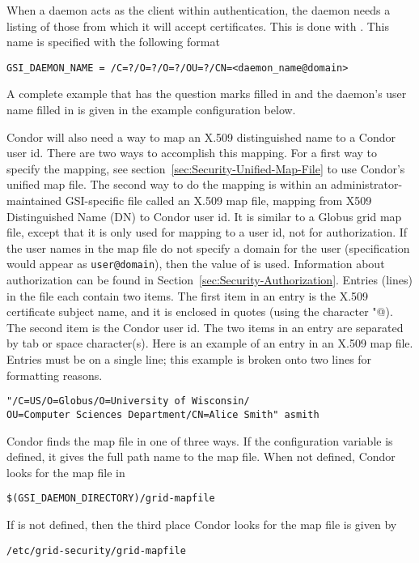 \begin{description}
When a daemon acts as the client within authentication,
the daemon needs a listing of those from which it
will accept certificates.
This is done with .
This name is specified with the following format
\footnotesize
\begin{verbatim}
GSI_DAEMON_NAME = /C=?/O=?/O=?/OU=?/CN=<daemon_name@domain>
\end{verbatim}
\normalsize
A complete example that has the question marks filled in and the
daemon's user name filled in is given in the 
example configuration below.

Condor will also need a way to map an X.509 distinguished
name to a Condor user id.
There are two ways to accomplish this mapping.
For a first way to specify the mapping, see
section~\ref{sec:Security-Unified-Map-File}
to use Condor's unified map file.
The second way to do the mapping is within
an administrator-maintained GSI-specific file called an X.509 map file,
mapping from X509 Distinguished Name (DN) to Condor user id.
It is similar to a Globus grid map file, except that it is only used for
mapping to a user id, not for authorization.  If the user names in the
map file do not specify a domain for the user
(specification would appear as \verb|user@domain|),
then the value of  is used.
Information about authorization can be found in
Section~\ref{sec:Security-Authorization}. 
Entries (lines) in the file each contain two items.
The first item in an entry is the 
X.509 certificate subject name, and it is enclosed in quotes
(using the character \verb@"@).
The second item is the Condor user id.
The two items in an entry are separated by tab or space character(s).
Here is an example of an entry in an X.509 map file.
Entries must be on a single line; this example is broken
onto two lines for formatting reasons.

\footnotesize
\begin{verbatim}
"/C=US/O=Globus/O=University of Wisconsin/
OU=Computer Sciences Department/CN=Alice Smith" asmith
\end{verbatim}
\normalsize

Condor finds the map file in one of three ways.
If the configuration variable  is defined,
it gives the full path name to the map file.
When not defined,
Condor looks for the map file in 
\begin{verbatim}
$(GSI_DAEMON_DIRECTORY)/grid-mapfile
\end{verbatim}
If  is not defined,
then the third place Condor looks for the map file is given by
\begin{verbatim}
/etc/grid-security/grid-mapfile
\end{verbatim}



\end{description}
